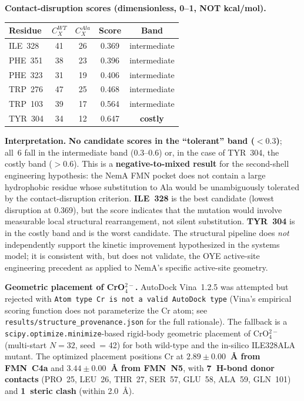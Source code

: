 \documentclass[10pt,twocolumn,letterpaper,
              colorlinks=true,
              linkcolor=blue!70!black,
              citecolor=blue!70!black,
              urlcolor=blue!70!black,
              pdfborder={0 0 0}]{article}
\begin{document}
\medskip
\textbf{Contact-disruption scores (dimensionless, 0--1, NOT
kcal/mol).}

\begin{center}
\small
\begin{tabular}{@{}lcccc@{}}
\toprule
Residue  & $C_X^{WT}$ & $C_X^{Ala}$ & Score & Band \\
\midrule
ILE~328  & 41 & 26 & 0.369 & intermediate \\
PHE~351  & 38 & 23 & 0.396 & intermediate \\
PHE~323  & 31 & 19 & 0.406 & intermediate \\
TRP~276  & 47 & 25 & 0.468 & intermediate \\
TRP~103  & 39 & 17 & 0.564 & intermediate \\
TYR~304  & 34 & 12 & 0.647 & \textbf{costly} \\
\bottomrule
\end{tabular}
\end{center}

\textbf{Interpretation.} \textbf{No candidate scores in the ``tolerant''
band ($< 0.3$)}; all~6 fall in the intermediate band (0.3--0.6) or, in
the case of TYR~304, the costly band (${>}0.6$). This is a
\textbf{negative-to-mixed result} for the second-shell engineering
hypothesis: the NemA FMN pocket does not contain a large hydrophobic
residue whose substitution to Ala would be unambiguously tolerated by
the contact-disruption criterion. \textbf{ILE~328} is the best
candidate (lowest disruption at 0.369), but the score indicates that the
mutation would involve measurable local structural rearrangement, not
silent substitution. \textbf{TYR~304} is in the costly band and is the
worst candidate. The structural pipeline does \textit{not} independently
support the kinetic improvement hypothesized in the systems model; it is
consistent with, but does not validate, the OYE active-site engineering
precedent as applied to NemA's specific active-site geometry.

\medskip
\textbf{Geometric placement of CrO$_4^{2-}$.} AutoDock Vina~1.2.5 was
attempted but rejected with \texttt{Atom type Cr is not a valid AutoDock
type} (Vina's empirical scoring function does not parameterize the Cr
atom; see \texttt{results/structure\_provenance.json} for the full
rationale). The fallback is a
\texttt{scipy.optimize.minimize}-based rigid-body geometric placement of
CrO$_4^{2-}$ (multi-start $N = 32$, seed~= 42) for both wild-type and
the in-silico ILE328ALA mutant. The optimized placement positions Cr at
\textbf{$2.89 \pm 0.00$~\AA{} from FMN~C4a} and
\textbf{$3.44 \pm 0.00$~\AA{} from FMN~N5}, with \textbf{7~H-bond
donor contacts} (PRO~25, LEU~26, THR~27, SER~57, GLU~58, ALA~59,
GLN~101) and \textbf{1~steric clash} (within 2.0~\AA{}).
\end{document}
